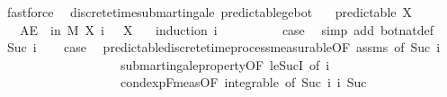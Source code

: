 \begin{isabellebody}
\ fastforce\isanewline
{}\isamarkupfalse%
%
\endisatagproof
{\isafoldproof}%
%
\isadelimproof
%
\endisadelimproof
%
\isadelimdocument
%
\endisadelimdocument
%
\isatagdocument
%
\isamarkuptrue%
%
\endisatagdocument
{\isafolddocument}%
%
\isadelimdocument
%
\endisadelimdocument
{}\isamarkupfalse%
\ {\isacharparenleft}{\kern0pt}\ discrete{\isacharunderscore}{\kern0pt}time{\isacharunderscore}{\kern0pt}submartingale{\isacharparenright}{\kern0pt}\ predictable{\isacharunderscore}{\kern0pt}ge{\isacharunderscore}{\kern0pt}bot{\isacharcolon}{\kern0pt}\isanewline
\ \ \ {\isachardoublequoteopen}predictable\ X{\isachardoublequoteclose}\isanewline
\ \ \ {\isachardoublequoteopen}AE\ {\isasymxi}\ in\ M{\isachardot}{\kern0pt}\ X\ i\ {\isasymxi}\ {\isasymge}\ X\ {\isasymbottom}\ {\isasymxi}{\isachardoublequoteclose}\isanewline
%
\isadelimproof
%
\endisadelimproof
%
\isatagproof
{}\isamarkupfalse%
\ {\isacharparenleft}{\kern0pt}induction\ i{\isacharparenright}{\kern0pt}\isanewline
\ \ \isamarkupfalse%
\ {}\isanewline
\ \ \isamarkupfalse%
\ \isamarkupfalse%
\ {\isacharquery}{\kern0pt}case\ \isamarkupfalse%
\ {\isacharparenleft}{\kern0pt}simp\ add{\isacharcolon}{\kern0pt}\ bot{\isacharunderscore}{\kern0pt}nat{\isacharunderscore}{\kern0pt}def{\isacharparenright}{\kern0pt}\isanewline
{}\isamarkupfalse%
\isanewline
\ \ \isamarkupfalse%
\ {\isacharparenleft}{\kern0pt}Suc\ i{\isacharparenright}{\kern0pt}\isanewline
\ \ \isamarkupfalse%
\ {\isacharquery}{\kern0pt}case\ \isamarkupfalse%
\ predictable{\isacharunderscore}{\kern0pt}discrete{\isacharunderscore}{\kern0pt}time{\isacharunderscore}{\kern0pt}process{\isacharunderscore}{\kern0pt}measurable{\isacharbrackleft}{\kern0pt}OF\ assms{\isacharcomma}{\kern0pt}\ of\ {\isachardoublequoteopen}Suc\ i{\isachardoublequoteclose}{\isacharbrackright}{\kern0pt}\ \isanewline
\ \ \ \ \ \ \ \ \ \ \ \ \ \ \ \ \ \ \ submartingale{\isacharunderscore}{\kern0pt}property{\isacharbrackleft}{\kern0pt}OF\ le{\isacharunderscore}{\kern0pt}SucI{\isacharcomma}{\kern0pt}\ of\ i{\isacharbrackright}{\kern0pt}\isanewline
\ \ \ \ \ \ \ \ \ \ \ \ \ \ \ \ \ \ \ cond{\isacharunderscore}{\kern0pt}exp{\isacharunderscore}{\kern0pt}F{\isacharunderscore}{\kern0pt}meas{\isacharbrackleft}{\kern0pt}OF\ integrable{\isacharcomma}{\kern0pt}\ of\ {\isachardoublequoteopen}Suc\ i{\isachardoublequoteclose}\ i{\isacharbrackright}{\kern0pt}\ Suc\ \isamarkupfalse%

\end{isabellebody}
